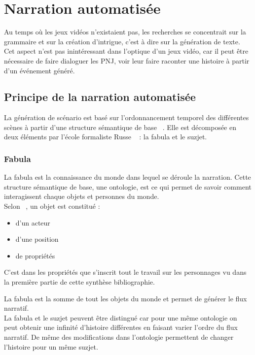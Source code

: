 \documentclass[asi]{picINSA}
\begin{document}
\chapter{Narration automatisée}

Au temps où les jeux vidéos n'existaient pas, les recherches se concentrait sur la grammaire et sur la création d'intrigue, c'est à dire sur la génération de texte. Cet aspect n'est pas inintéressant dans l'optique d'un jeux vidéo, car il peut être nécessaire de faire dialoguer les PNJ, voir leur faire raconter une histoire à partir d'un événement généré.


\section{Principe de la narration automatisée}

La génération de scénario est basé sur l'ordonnancement temporel des différentes scènes à partir d'une structure sémantique de base ~\cite{cavazza2002character}. Elle est décomposée en deux éléments par l'école formaliste Russe ~\cite{Callaway2002213} : la fabula et le suzjet. \\

\subsection{Fabula}

La fabula est la connaissance du monde dans lequel se déroule la narration. Cette structure sémantique de base, une ontologie, est ce qui permet de savoir comment interagissent chaque objets et personnes du monde. \\

Selon ~\cite{callaway2002narrative}, un objet est constitué :
\begin{itemize}
\item d'un acteur
\item d'une position
\item de propriétés \\
\end{itemize}

C'est dans les propriétés que s'inscrit tout le travail sur les personnages vu dans la première partie de cette synthèse bibliographie.

La fabula est la somme de tout les objets du monde et permet de générer le flux narratif. \\

La fabula et le suzjet peuvent être distingué car pour une même ontologie on peut obtenir une infinité d'histoire différentes en faisant varier l'ordre du flux narratif. De même des modifications dans l'ontologie permettent de changer l'histoire pour un même suzjet.
\end{document}
